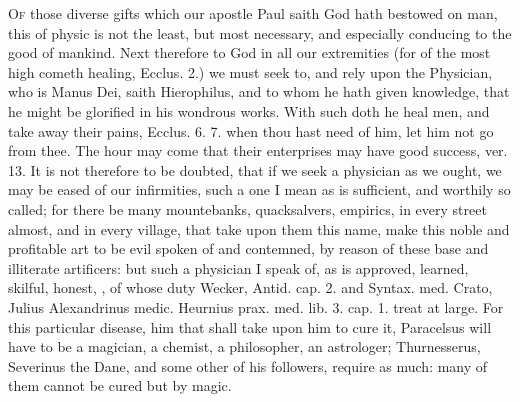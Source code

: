 {\lettrine{O}{f} those diverse gifts which our apostle Paul saith God hath bestowed
on man, this of physic is not the least, but most necessary, and
especially conducing to the good of mankind. Next therefore to God in
all our extremities (for of the most high cometh healing, Ecclus.
 2.) we must seek to, and rely upon the Physician, who is
Manus Dei, saith Hierophilus, and to whom he hath given knowledge, that
he might be glorified in his wondrous works. With such doth he heal
men, and take away their pains, Ecclus.  6. 7. when thou hast
need of him, let him not go from thee. The hour may come that their
enterprises may have good success, ver. 13. It is not therefore to be
doubted, that if we seek a physician as we ought, we may be eased of
our infirmities, such a one I mean as is sufficient, and worthily so
called; for there be many mountebanks, quacksalvers, empirics, in every
street almost, and in every village, that take upon them this name,
make this noble and profitable art to be evil spoken of and contemned,
by reason of these base and illiterate artificers: but such a physician
I speak of, as is approved, learned, skilful, honest, \etc{}, of whose
duty Wecker, Antid. cap. 2. and Syntax. med. Crato, Julius Alexandrinus
medic. Heurnius prax. med. lib. 3. cap. 1. \etc{} treat at large. For this
particular disease, him that shall take upon him to cure it,
Paracelsus will have to be a magician, a chemist, a philosopher,
an astrologer; Thurnesserus, Severinus the Dane, and some other of his
followers, require as much: many of them cannot be cured but by magic.

}
